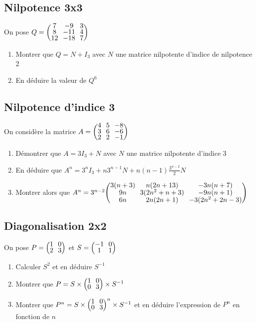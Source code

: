 \documentclass[oneside,12pt]{book}          %
\begin{document}
    
\subsection{Nilpotence 3x3}
On pose $Q=\matrice{7&-9&3\\8&-11&4\\12&-18&7} $ 
    \begin{enumerate}
        \item Montrer que $Q=N+I_3$ avec $N$ une matrice nilpotente d'indice de nilpotence 2
        \item En déduire la valeur de $Q^6$
    \end{enumerate}



\subsection{Nilpotence d'indice 3}
On considère la matrice $A=\matrice{4&5&-8\\3&6&-6\\2&2&-1}$
\begin{enumerate}
    \item Démontrer que $A=3I_3+N$ avec $N$ une matrice nilpotente d'indice 3
    \item En déduire que $A^n=3^nI_3+n3^{n-1}N+n(n-1)\frac{3^{n-2}}{2}N$
    \item Montrer alors que $A^n=3^{n-2}\matrice{3(n+3) & n(2n+13) & -3n(n+7)\\9n & 3(2n^2+n+3) & -9n(n+1) \\ 6n & 2n(2n+1) & -3(2n^2+2n-3)}$
\end{enumerate}



\subsection{Diagonalisation 2x2}
On pose $P=\matrice{1&0\\2&3} $ et $S=\matrice{-1&0\\1&1} $
\begin{enumerate}
    \item Calculer $S^2$ et en déduire $S^{-1}$
    \item Montrer que $P=S\times\matrice{1&0\\0&3}\times S^{-1}$
    \item Montrer que $P^n=S\times\matrice{1&0\\0&3}^n\times S^{-1}$ et en déduire l'expression de $P^n$ en fonction de $n$
\end{enumerate}
\end{document}
